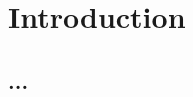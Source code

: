 
\chapter{Introduction}
\label{chapter:introduction}
\cite{Blanchard1979,Gullberg2008,Kummel1989a,Berend2006,Evans2006a}
\section{...}
\citet{Hiebeler2006,wiedermann2015macro,Menck2013}
\citet{Berend2006}
